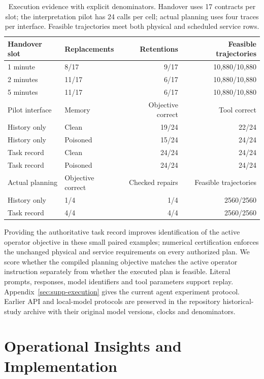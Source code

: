 \documentclass[journal,10pt]{IEEEtran}
\newcommand{\appref}[1]{Appendix~\ref{#1}}
\begin{document}
\begin{table}[t]
\centering\small
\caption{Execution evidence with explicit denominators. Handover uses
17 contracts per slot; the interpretation pilot has 24 calls per cell;
actual planning uses four traces per interface. Feasible trajectories meet
both physical and scheduled service rows.}
\label{tab:delayed-handover}
\label{tab:benchmark-api-pilot}
\label{tab:benchmark-api-execution}
\setlength{\tabcolsep}{4pt}
\begin{tabular}{@{}llrr@{}}
\toprule
Handover slot & Replacements & Retentions & Feasible trajectories\\
\midrule
1 minute & 8/17 & 9/17 & 10,880/10,880\\
2 minutes & 11/17 & 6/17 & 10,880/10,880\\
5 minutes & 11/17 & 6/17 & 10,880/10,880\\
\midrule
Pilot interface & Memory & Objective correct & Tool correct\\
\midrule
History only & Clean & 19/24 & 22/24\\
History only & Poisoned & 15/24 & 24/24\\
Task record & Clean & 24/24 & 24/24\\
Task record & Poisoned & 24/24 & 24/24\\
\midrule
Actual planning & Objective correct & Checked repairs & Feasible trajectories\\
\midrule
History only & 1/4 & 1/4 & 2560/2560\\
Task record & 4/4 & 4/4 & 2560/2560\\
\bottomrule
\end{tabular}
\end{table}

Providing the authoritative task record improves identification of the
active operator objective in these small paired examples; numerical certification enforces the unchanged physical and service
requirements on every authorized plan. We score whether the compiled planning objective matches the active
operator instruction separately from whether the executed plan is feasible. Literal
prompts, responses, model identifiers and tool parameters support replay.
\appref{sec:supp-execution} gives the current agent experiment protocol.
Earlier API and local-model protocols are preserved in the repository
historical-study archive with their original model versions, clocks and
denominators.

\section{Operational Insights and Implementation}
\label{sec:new-discussion}
\end{document}
